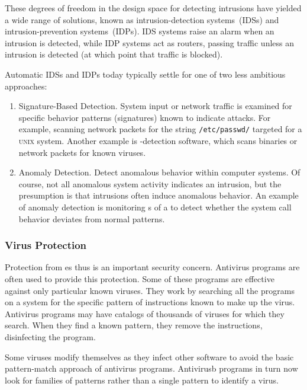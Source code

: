 These degrees of freedom in the design space for detecting intrusions have yielded a wide range of solutions, known as intrusion-detection systems~(IDSs) and intrusion-prevention systems~(IDPs).
IDS systems raise an alarm when an intrusion is detected, while IDP systems act as routers, passing traffic unless an intrusion is detected (at which point that traffic is blocked).

Automatic IDSs and IDPs today typically settle for one of two less ambitious approaches:
\begin{enumerate}[noitemsep]
\item Signature-Based Detection.
  System input or network traffic is examined for specific behavior patterns (signatures) known to indicate attacks.
  For example, scanning network packets for the string \texttt{/etc/passwd/} targeted for a \textsc{unix} system.
  Another example is -detection software, which scans binaries or network packets for known viruses.
\item Anomaly Detection.
  Detect anomalous behavior within computer systems.
  Of course, not all anomalous system activity indicates an intrusion, but the presumption is that intrusions often induce anomalous behavior.
  An example of anomaly detection is monitoring s of a   to detect whether the system call behavior deviates from normal patterns.
\end{enumerate}

\subsubsection{Virus Protection}\label{subsubsec:Virus_Protection}
Protection from es thus is an important security concern.
Antivirus programs are often used to provide this protection.
Some of these programs are effective against only particular known viruses.
They work by searching all the programs on a system for the specific pattern of instructions known to make up the virus.
Antivirus programs may have catalogs of thousands of viruses for which they search.
When they find a known pattern, they remove the instructions, disinfecting the program.

Some viruses modify themselves as they infect other software to avoid the basic pattern-match approach of antivirus programs. Antivirusb
programs in turn now look for families of patterns rather than a single pattern to identify a virus.

